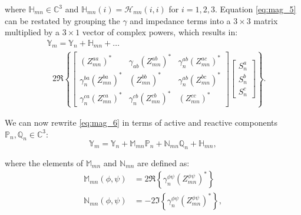 \noindent where $\mathbb{H}_{mn} \in \mathbb{C}^{3}$ and $\mathbb{H}_{mn}(i) = \mathcal H_{mn}(i,i)$ for $i = 1,2,3$.  Equation \eqref{eq:mag_5} can be restated by grouping the $\gamma$ and impedance terms into a $3\times 3$ matrix multiplied by a $3 \times 1$ vector of complex powers, which results in:
\begin{align}
	& \mathbb{Y}_{m} = \mathbb{Y}_{n} + \mathbb{H}_{mn} + \ldots \nonumber \\
    & \text{ } 2 \Re \left\{
    \begin{bmatrix}
    	{\left( Z_{mn}^{aa} \right)}^{*} & \gamma_{ab} {\left( Z_{mn}^{ab} \right)}^{*} & \gamma_{n}^{ab} {\left( Z_{mn}^{ac} \right)}^{*} \\
    	\gamma_{n}^{ba} {\left( Z_{mn}^{ba} \right)}^{*} & {\left( Z_{mn}^{bb} \right)}^{*} & \gamma_{n}^{ab} {\left( Z_{mn}^{bc} \right)}^{*} \\
    	\gamma_{n}^{ca} {\left( Z_{mn}^{ca} \right)}^{*} & \gamma_{n}^{cb} {\left( Z_{mn}^{cb} \right)}^{*} & {\left( Z_{mn}^{cc} \right)}^{*}
    \end{bmatrix}
    \begin{bmatrix}
    	S_{n}^{a} \\ S_{n}^{b} \\ S_{n}^{c}
    \end{bmatrix}
	\right\}
    \label{eq:mag_6}.
\end{align}

We can now rewrite \eqref{eq:mag_6} in terms of active and reactive components $\mathbb{P}_{n},\mathbb{Q}_{n} \in \mathbb C^{3}$:
\begin{equation}
	\mathbb{Y}_{m} = \mathbb{Y}_{n} + \mathbb{M}_{mn} \mathbb{P}_{n} + \mathbb{N}_{mn} \mathbb{Q}_{n} + \mathbb{H}_{mn},
    \label{eq:mag_7}
\end{equation}

\noindent where the elements of $\mathbb{M}_{mn}$ and $\mathbb{N}_{mn}$ are defined as:
\begin{align}
	\mathbb{M}_{mn} (\phi, \psi) &= 2\Re \left\{\gamma_{n}^{\phi \psi} {\left( Z_{mn}^{\phi \psi} \right)}^{*} \right\} \label{eq:mag_8} \\
    \mathbb{N}_{mn} (\phi, \psi) &= -2\Im \left\{\gamma_{n}^{\phi \psi} {\left( Z_{mn}^{\phi \psi} \right)}^{*} \right\} \label{eq:mag_9},
\end{align}

